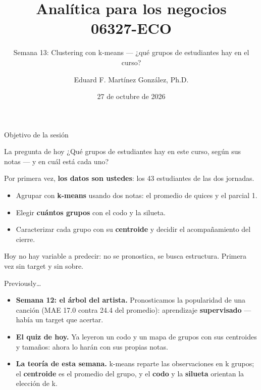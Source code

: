 \documentclass{beamer}
\title[06327-ECO]{Analítica para los negocios \\ 06327-ECO}
\subtitle{Semana 13: Clustering con k-means --- ¿qué grupos de estudiantes hay en el curso?}
\author{Eduard F. Martínez González, Ph.D.}
\institute[]{Departamento de Economía, Universidad Icesi}
\date{27 de octubre de 2026}
\begin{document}
\begin{frame}
\titlepage
\end{frame}

\begin{frame}{Objetivo de la sesión}
\small
\begin{block}{La pregunta de hoy}
¿Qué grupos de estudiantes hay en este curso, según sus notas --- y en cuál está cada uno?
\end{block}

\vspace{0.2cm}
Por primera vez, \textbf{los datos son ustedes}: los 43 estudiantes de las dos jornadas.
\begin{itemize} \setlength{\itemsep}{0.15cm}
  \item Agrupar con \textbf{k-means} usando dos notas: el promedio de quices y el parcial 1.
  \item Elegir \textbf{cuántos grupos} con el codo y la silueta.
  \item Caracterizar cada grupo con su \textbf{centroide} y decidir el acompañamiento del cierre.
\end{itemize}

\vspace{0.25cm}
\textcolor{azulcaso}{Hoy no hay variable a predecir: no se pronostica, se busca estructura. Primera vez sin target y sin sobre.}
\end{frame}

\begin{frame}{Previously\ldots}
\small
\begin{itemize} \setlength{\itemsep}{0.25cm}
  \item \textbf{Semana 12: el árbol del artista.} Pronosticamos la popularidad de una canción (MAE 17.0 contra 24.4 del promedio): aprendizaje \textbf{supervisado} --- había un target que acertar.
  \item \textbf{El quiz de hoy.} Ya leyeron un codo y un mapa de grupos con sus centroides y tamaños: ahora lo harán con sus propias notas.
  \item \textbf{La teoría de esta semana.} k-means reparte las observaciones en k grupos; el \textbf{centroide} es el promedio del grupo, y el \textbf{codo} y la \textbf{silueta} orientan la elección de k.
\end{itemize}
\end{frame}
\end{document}

